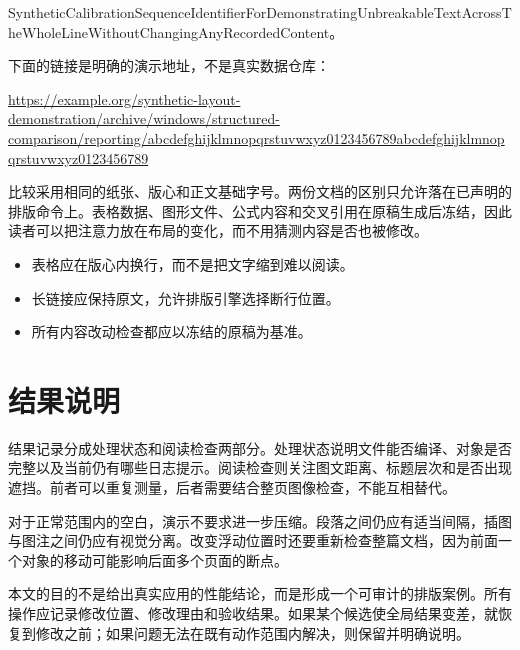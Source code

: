 \documentclass[UTF8,10pt,a4paper,fontset=windows]{ctexart}
\begin{document}
Synt\-heti\-cCal\-ibra\-tion\-Sequ\-ence\-Iden\-tifi\-erFo\-rDem\-onst\-rati\-ngUn\-brea\-kabl\-eTex\-tAcr\-ossT\-heWh\-oleL\-ineW\-itho\-utCh\-angi\-ngAn\-yRec\-orde\-dCon\-tent。

下面的链接是明确的演示地址，不是真实数据仓库：

\url{https://example.org/synthetic-layout-demonstration/archive/windows/structured-comparison/reporting/abcdefghijklmnopqrstuvwxyz0123456789abcdefghijklmnopqrstuvwxyz0123456789}

比较采用相同的纸张、版心和正文基础字号。两份文档的区别只允许落在已声明的排版命令上。表格数据、图形文件、公式内容和交叉引用在原稿生成后冻结，因此读者可以把注意力放在布局的变化，而不用猜测内容是否也被修改。



\begin{itemize}
\item 表格应在版心内换行，而不是把文字缩到难以阅读。
\item 长链接应保持原文，允许排版引擎选择断行位置。
\item 所有内容改动检查都应以冻结的原稿为基准。
\end{itemize}
\section{结果说明}
结果记录分成处理状态和阅读检查两部分。处理状态说明文件能否编译、对象是否完整以及当前仍有哪些日志提示。阅读检查则关注图文距离、标题层次和是否出现遮挡。前者可以重复测量，后者需要结合整页图像检查，不能互相替代。

对于正常范围内的空白，演示不要求进一步压缩。段落之间仍应有适当间隔，插图与图注之间仍应有视觉分离。改变浮动位置时还要重新检查整篇文档，因为前面一个对象的移动可能影响后面多个页面的断点。

本文的目的不是给出真实应用的性能结论，而是形成一个可审计的排版案例。所有操作应记录修改位置、修改理由和验收结果。如果某个候选使全局结果变差，就恢复到修改之前；如果问题无法在既有动作范围内解决，则保留并明确说明。
\end{document}

